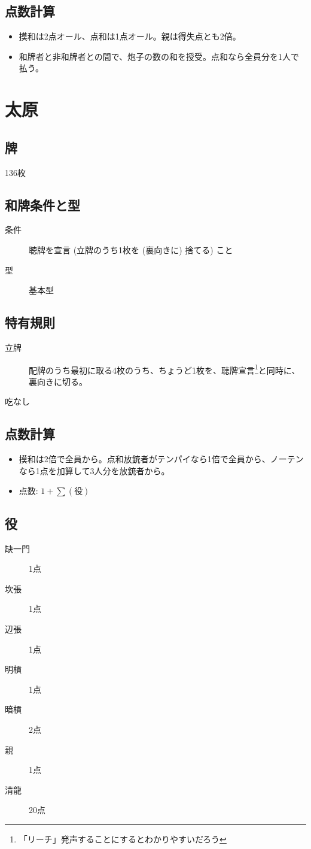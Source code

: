 \documentclass{ltjsarticle}
\begin{document}
\subsection{点数計算}
\begin{itemize}
    \item 摸和は2点オール、点和は1点オール。親は得失点とも2倍。
    \item 和牌者と非和牌者との間で、炮子の数の和を授受。点和なら全員分を1人で払う。
\end{itemize}
\section{太原}
\subsection{牌}136枚
\subsection{和牌条件と型}
\begin{description}
    \item[条件] 聴牌を宣言 (立牌のうち1枚を (裏向きに) 捨てる) こと
    \item[型] 基本型
\end{description}
\subsection{特有規則}
\begin{description}
    \item[立牌] 配牌のうち最初に取る4枚のうち、ちょうど1枚を、聴牌宣言\footnote{「リーチ」発声することにするとわかりやすいだろう}と同時に、裏向きに切る。
    \item[吃なし]
\end{description}
\subsection{点数計算}
\begin{itemize}
    \item 摸和は2倍で全員から。点和放銃者がテンパイなら1倍で全員から、ノーテンなら1点を加算して3人分を放銃者から。
    \item 点数: $1+\sum(\text{役})$
\end{itemize}
\subsection{役}
\begin{description}
    \item[缺一門] 1点
    \item[坎張] 1点
    \item[辺張] 1点
    \item[明槓] 1点
    \item[暗槓] 2点
    \item[親] 1点
    \item[清龍] 20点
\end{description}
\end{document}
